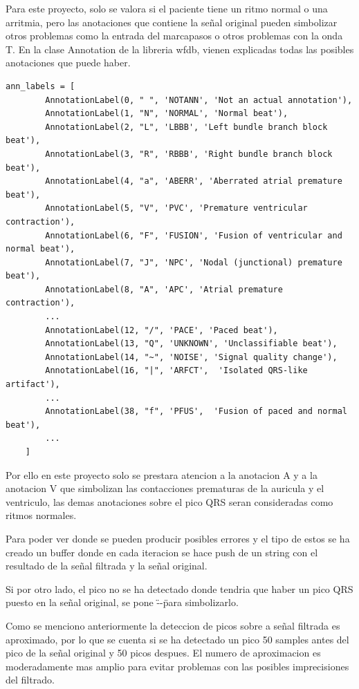 Para este proyecto, solo se valora si el paciente tiene un ritmo normal o una arritmia, pero las anotaciones
que contiene la señal original pueden simbolizar otros problemas como la entrada del marcapasos o otros problemas con la onda T.
En la clase Annotation de la libreria wfdb, vienen explicadas todas las posibles anotaciones que puede haber.
\lstset{language=python, breaklines=true, basicstyle=\footnotesize}
\begin{lstlisting}[frame=single]
    ann_labels = [
        AnnotationLabel(0, " ", 'NOTANN', 'Not an actual annotation'),
        AnnotationLabel(1, "N", 'NORMAL', 'Normal beat'),
        AnnotationLabel(2, "L", 'LBBB', 'Left bundle branch block beat'),
        AnnotationLabel(3, "R", 'RBBB', 'Right bundle branch block beat'),
        AnnotationLabel(4, "a", 'ABERR', 'Aberrated atrial premature beat'),
        AnnotationLabel(5, "V", 'PVC', 'Premature ventricular contraction'),
        AnnotationLabel(6, "F", 'FUSION', 'Fusion of ventricular and normal beat'),
        AnnotationLabel(7, "J", 'NPC', 'Nodal (junctional) premature beat'),
        AnnotationLabel(8, "A", 'APC', 'Atrial premature contraction'),
        ...
        AnnotationLabel(12, "/", 'PACE', 'Paced beat'),
        AnnotationLabel(13, "Q", 'UNKNOWN', 'Unclassifiable beat'),
        AnnotationLabel(14, "~", 'NOISE', 'Signal quality change'),
        AnnotationLabel(16, "|", 'ARFCT',  'Isolated QRS-like artifact'),
        ...
        AnnotationLabel(38, "f", 'PFUS',  'Fusion of paced and normal beat'),
        ...
    ]
\end{lstlisting}

Por ello en este proyecto solo se prestara atencion a la anotacion A y a la anotacion V que simbolizan 
las contacciones prematuras de la auricula y el ventriculo, las demas anotaciones sobre el pico QRS seran 
consideradas como ritmos normales.

Para poder ver donde se pueden producir posibles errores y el tipo de estos se ha creado un buffer donde en 
cada iteracion se hace push de un string con el resultado de la señal filtrada y la señal original.

Si por otro lado, el pico no se ha detectado donde tendria que haber un pico QRS puesto en la señal original, 
se pone \"--\" para simbolizarlo.

Como se menciono anteriormente la deteccion de picos sobre a señal filtrada es aproximado, por lo que se cuenta
si se ha detectado un pico 50 samples antes del pico de la señal original y 50 picos despues. El numero de aproximacion 
es moderadamente mas amplio para evitar problemas con las posibles imprecisiones del filtrado.  

